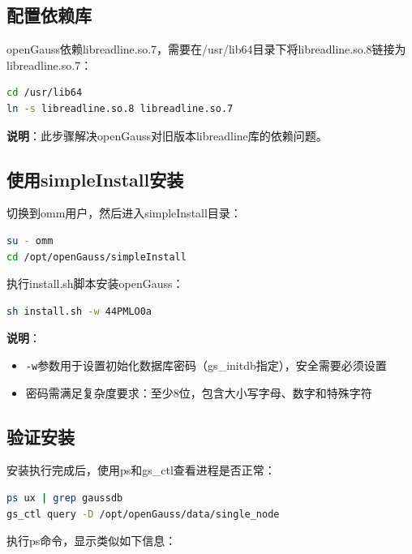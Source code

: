 \documentclass[12pt,UTF8]{ctexbook}
\begin{document}
\subsection{配置依赖库}

openGauss依赖libreadline.so.7，需要在/usr/lib64目录下将libreadline.so.8链接为libreadline.so.7：

\begin{lstlisting}[language=bash, caption=配置libreadline库]
cd /usr/lib64
ln -s libreadline.so.8 libreadline.so.7
\end{lstlisting}

\textbf{说明}：此步骤解决openGauss对旧版本libreadline库的依赖问题。

\subsection{使用simpleInstall安装}

切换到omm用户，然后进入simpleInstall目录：

\begin{lstlisting}[language=bash, caption=切换用户并进入simpleInstall目录]
su - omm
cd /opt/openGauss/simpleInstall
\end{lstlisting}

执行install.sh脚本安装openGauss：

\begin{lstlisting}[language=bash, caption=执行安装脚本]
sh install.sh -w 44PMLO0a
\end{lstlisting}

\textbf{说明}：
\begin{itemize}[leftmargin=2cm]
    \item \texttt{-w}参数用于设置初始化数据库密码（gs\_initdb指定），安全需要必须设置
    \item 密码需满足复杂度要求：至少8位，包含大小写字母、数字和特殊字符
\end{itemize}

\subsection{验证安装}

安装执行完成后，使用ps和gs\_ctl查看进程是否正常：

\begin{lstlisting}[language=bash, caption=Check process status]
ps ux | grep gaussdb
gs_ctl query -D /opt/openGauss/data/single_node
\end{lstlisting}

执行ps命令，显示类似如下信息：
\end{document}
